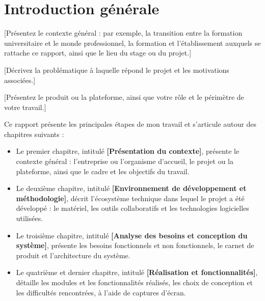 \chapter*{Introduction générale}

[Présentez le contexte général : par exemple, la transition entre la formation universitaire et le monde professionnel,
la formation et l'établissement auxquels se rattache ce rapport, ainsi que le lieu du stage ou du projet.]

[Décrivez la problématique à laquelle répond le projet et les motivations associées.]

[Présentez le produit ou la plateforme, ainsi que votre rôle et le périmètre de votre travail.]

Ce rapport présente les principales étapes de mon travail et s'articule autour des chapitres suivants :

\begin{itemize}
    \item Le premier chapitre, intitulé \textbf{[Présentation du contexte]}, présente le contexte
    général : l'entreprise ou l'organisme d'accueil, le projet ou la plateforme,
    ainsi que le cadre et les objectifs du travail.

    \item Le deuxième chapitre, intitulé \textbf{[Environnement de développement et méthodologie]},
    décrit l'écosystème technique dans lequel le projet a été développé : le matériel,
    les outils collaboratifs et les technologies logicielles utilisées.

    \item Le troisième chapitre, intitulé \textbf{[Analyse des besoins et conception du système]},
    présente les besoins fonctionnels et non fonctionnels, le carnet de produit
    et l'architecture du système.

    \item Le quatrième et dernier chapitre, intitulé \textbf{[Réalisation et fonctionnalités]}, détaille les
    modules et les fonctionnalités réalisés, les choix de conception et les difficultés
    rencontrées, à l'aide de captures d'écran.

\end{itemize}
